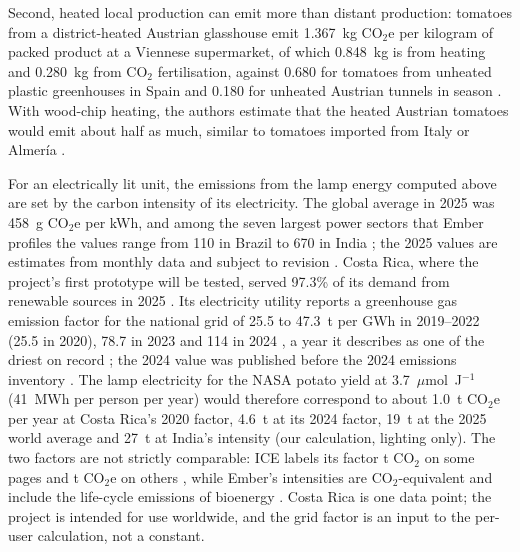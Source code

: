 Second, heated local production can emit more than distant production: tomatoes from a district-heated Austrian glasshouse emit 1.367~kg CO$_2$e per kilogram of packed product at a Viennese supermarket, of which 0.848~kg is from heating and 0.280~kg from CO$_2$ fertilisation, against 0.680 for tomatoes from unheated plastic greenhouses in Spain and 0.180 for unheated Austrian tunnels in season \cite[Table~2, p.~6]{theurl2014tomato}. With wood-chip heating, the authors estimate that the heated Austrian tomatoes would emit about half as much, similar to tomatoes imported from Italy or Almer\'ia \cite[pp.~8--9]{theurl2014tomato}.%

For an electrically lit unit, the emissions from the lamp energy computed above are set by the carbon intensity of its electricity. The global average in 2025 was 458~g CO$_2$e per kWh, and among the seven largest power sectors that Ember profiles the values range from 110 in Brazil to 670 in India \cite[pp.~23, 96, 109]{ember2026ger}; the 2025 values are estimates from monthly data and subject to revision \cite[pp.~113--114]{ember2026ger}. Costa Rica, where the project's first prototype will be tested, served 97.3\% of its demand from renewable sources in 2025 \cite[Section~3.2.1, p.~3]{ice2025renovable}. Its electricity utility reports a greenhouse gas emission factor for the national grid of 25.5 to 47.3~t per GWh in 2019--2022 (25.5 in 2020), 78.7 in 2023 and 114 in 2024 \cite[p.~58]{ice2024sostenibilidad}, a year it describes as one of the driest on record \cite[p.~5]{ice2024sostenibilidad}; the 2024 value was published before the 2024 emissions inventory \cite[p.~58]{ice2024sostenibilidad}. The lamp electricity for the NASA potato yield at 3.7~$\mu$mol~J$^{-1}$ (41~MWh per person per year) would therefore correspond to about 1.0~t CO$_2$e per year at Costa Rica's 2020 factor, 4.6~t at its 2024 factor, 19~t at the 2025 world average and 27~t at India's intensity (our calculation, lighting only). The two factors are not strictly comparable: ICE labels its factor t CO$_2$ on some pages and t CO$_2$e on others \cite[pp.~12, 25, 57--58]{ice2024sostenibilidad}, while Ember's intensities are CO$_2$-equivalent and include the life-cycle emissions of bioenergy \cite[p.~114]{ember2026ger}. Costa Rica is one data point; the project is intended for use worldwide, and the grid factor is an input to the per-user calculation, not a constant.

